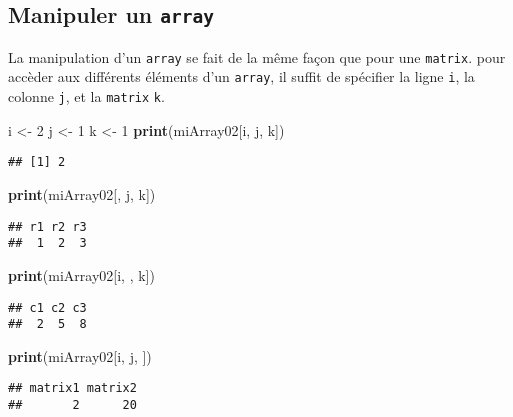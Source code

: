 \documentclass[]{book}
\newenvironment{Shaded}{\begin{snugshade}}{\end{snugshade}}
\newcommand{\KeywordTok}[1]{\textcolor[rgb]{0.13,0.29,0.53}{\textbf{#1}}}
\newcommand{\DecValTok}[1]{\textcolor[rgb]{0.00,0.00,0.81}{#1}}
\newcommand{\StringTok}[1]{\textcolor[rgb]{0.31,0.60,0.02}{#1}}
\newcommand{\NormalTok}[1]{#1}
\theoremstyle{definition}
\theoremstyle{definition}
\theoremstyle{definition}
\theoremstyle{remark}
\begin{document}
\subsection{\texorpdfstring{Manipuler un
\texttt{array}}{Manipuler un array}}\label{manipuler-un-array}

La manipulation d'un \texttt{array} se fait de la même façon que pour
une \texttt{matrix}. pour accèder aux différents éléments d'un
\texttt{array}, il suffit de spécifier la ligne \texttt{i}, la colonne
\texttt{j}, et la \texttt{matrix} \texttt{k}.

\begin{Shaded}
\begin{Highlighting}[]
\NormalTok{i <-}\StringTok{ }\DecValTok{2}
\NormalTok{j <-}\StringTok{ }\DecValTok{1}
\NormalTok{k <-}\StringTok{ }\DecValTok{1}
\KeywordTok{print}\NormalTok{(miArray02[i, j, k])}
\end{Highlighting}
\end{Shaded}

\begin{verbatim}
## [1] 2
\end{verbatim}

\begin{Shaded}
\begin{Highlighting}[]
\KeywordTok{print}\NormalTok{(miArray02[, j, k])}
\end{Highlighting}
\end{Shaded}

\begin{verbatim}
## r1 r2 r3 
##  1  2  3
\end{verbatim}

\begin{Shaded}
\begin{Highlighting}[]
\KeywordTok{print}\NormalTok{(miArray02[i, , k])}
\end{Highlighting}
\end{Shaded}

\begin{verbatim}
## c1 c2 c3 
##  2  5  8
\end{verbatim}

\begin{Shaded}
\begin{Highlighting}[]
\KeywordTok{print}\NormalTok{(miArray02[i, j, ])}
\end{Highlighting}
\end{Shaded}

\begin{verbatim}
## matrix1 matrix2 
##       2      20
\end{verbatim}
\end{document}
